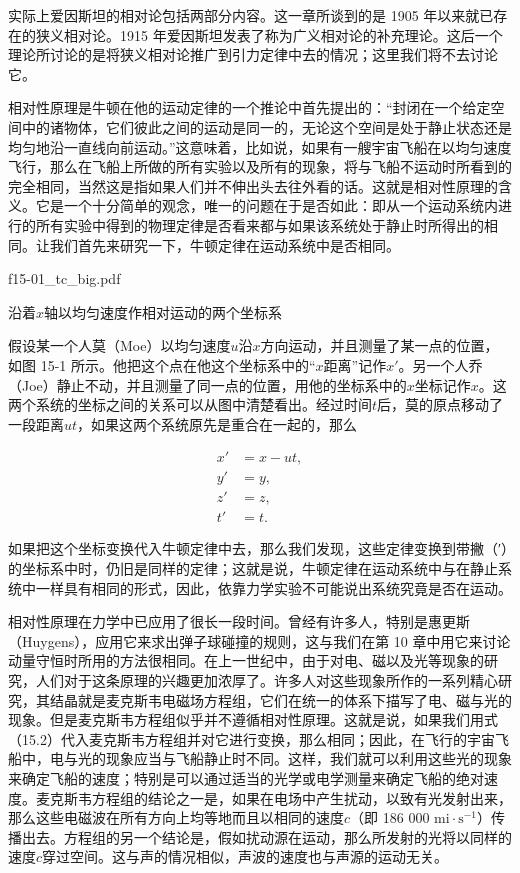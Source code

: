 \documentclass[12pt,oneside]{book}
\begin{document}
实际上爱因斯坦的相对论包括两部分内容。这一章所谈到的是 1905 年以来就已存在的狭义相对论。1915 年爱因斯坦发表了称为广义相对论的补充理论。这后一个理论所讨论的是将狭义相对论推广到引力定律中去的情况；这里我们将不去讨论它。


相对性原理是牛顿在他的运动定律的一个推论中首先提出的：“封闭在一个给定空间中的诸物体，它们彼此之间的运动是同一的，无论这个空间是处于静止状态还是均匀地沿一直线向前运动。”这意味着，比如说，如果有一艘宇宙飞船在以均匀速度飞行，那么在飞船上所做的所有实验以及所有的现象，将与飞船不运动时所看到的完全相同，当然这是指如果人们并不伸出头去往外看的话。这就是相对性原理的含义。它是一个十分简单的观念，唯一的问题在于是否如此：即从一个运动系统内进行的所有实验中得到的物理定律是否看来都与如果该系统处于静止时所得出的相同。让我们首先来研究一下，牛顿定律在运动系统中是否相同。

\begin{fig}{f15-01_tc_big.pdf}
\caption{沿着$x$轴以均匀速度作相对运动的两个坐标系}
\label{fig:15-1}
\end{fig}

假设某一个人莫（Moe）以均匀速度$u$沿$x$方向运动，并且测量了某一点的位置，如图 15-1 所示。他把这个点在他这个坐标系中的“$x$距离”记作$x'$。另一个人乔（Joe）静止不动，并且测量了同一点的位置，用他的坐标系中的$x$坐标记作$x$。这两个系统的坐标之间的关系可以从图中清楚看出。经过时间$t$后，莫的原点移动了一段距离$ut$，如果这两个系统原先是重合在一起的，那么


\begin{equation}
\begin{aligned}
x'&=x-ut,\\
y'&=y,\\
z'&=z,\\
t'&=t.
\end{aligned}
\label{Eq:I:15:2}
\end{equation}



如果把这个坐标变换代入牛顿定律中去，那么我们发现，这些定律变换到带撇（′）的坐标系中时，仍旧是同样的定律；这就是说，牛顿定律在运动系统中与在静止系统中一样具有相同的形式，因此，依靠力学实验不可能说出系统究竟是否在运动。


相对性原理在力学中已应用了很长一段时间。曾经有许多人，特别是惠更斯（Huygens），应用它来求出弹子球碰撞的规则，这与我们在第 10 章中用它来讨论动量守恒时所用的方法很相同。在上一世纪中，由于对电、磁以及光等现象的研究，人们对于这条原理的兴趣更加浓厚了。许多人对这些现象所作的一系列精心研究，其结晶就是麦克斯韦电磁场方程组，它们在统一的体系下描写了电、磁与光的现象。但是麦克斯韦方程组似乎并不遵循相对性原理。这就是说，如果我们用式（15.2）代入麦克斯韦方程组并对它进行变换，那么相同；因此，在飞行的宇宙飞船中，电与光的现象应当与飞船静止时不同。这样，我们就可以利用这些光的现象来确定飞船的速度；特别是可以通过适当的光学或电学测量来确定飞船的绝对速度。麦克斯韦方程组的结论之一是，如果在电场中产生扰动，以致有光发射出来，那么这些电磁波在所有方向上均等地而且以相同的速度$c$（即 186 000 $\text{mi}\cdot \text{s}^{-1}$）传播出去。方程组的另一个结论是，假如扰动源在运动，那么所发射的光将以同样的速度$c$穿过空间。这与声的情况相似，声波的速度也与声源的运动无关。
\end{document}
